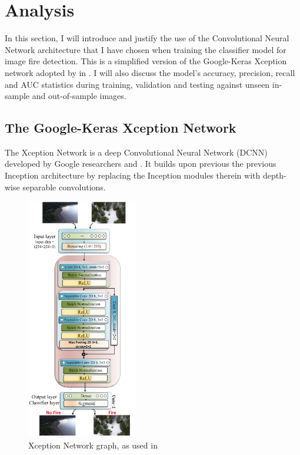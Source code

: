 \documentclass[a4paper,11pt]{article} %
\begin{document}
\section{Analysis}
In this section, I will introduce and justify the use of the Convolutional Neural Network architecture that I have chosen when training the
classifier model for image fire detection. This is a simplified version of the Google-Keras Xception network adopted by  in . I will also discuss the model's accuracy, precision, recall and AUC statistics during training, validation and testing against 
unseen in-sample and out-of-sample images.

\subsection{The Google-Keras Xception Network}
The Xception Network is a deep Convolutional Neural Network (DCNN) developed by Google researchers  \cite{Xception} and  \cite{Szegedy_2016_CVPR,Szegedy_Ioffe_Vanhoucke_Alemi_2017}.
It builds upon previous the previous Inception architecture by replacing the Inception modules therein with depth-wise separable convolutions.

\pagebreak

\begin{figure}
    \begin{center}
        \includegraphics[width=0.43\textwidth]{../figures/Xception_network.png}
    \end{center}
    \caption{Xception Network graph, as used in \cite{FLAME_dataset}}
    \label{fig:Xception}
\end{figure}
\end{document}

